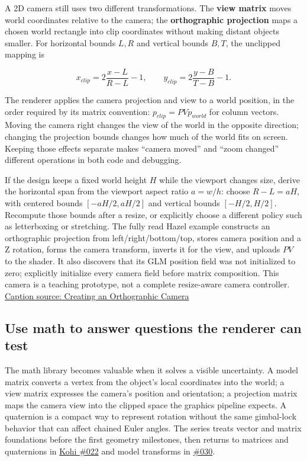 \hypertarget{06-engine-ii-ch026-keep-an-orthographic-cameras-view-and-projection-jobs-separate}{}

A 2D camera still uses two different transformations. The \textbf{view matrix} moves world coordinates relative to the camera; the \textbf{orthographic projection} maps a chosen world rectangle into clip coordinates without making distant objects smaller. For horizontal bounds \(L,R\) and vertical bounds \(B,T\), the unclipped mapping is

\[
x_{clip}=2\frac{x-L}{R-L}-1,\qquad y_{clip}=2\frac{y-B}{T-B}-1.
\]

The renderer applies the camera projection and view to a world position, in the order required by its matrix convention: \(p_{clip}=P V p_{world}\) for column vectors. Moving the camera right changes the view of the world in the opposite direction; changing the projection bounds changes how much of the world fits on screen. Keeping those effects separate makes ``camera moved'' and ``zoom changed'' different operations in both code and debugging.

If the design keeps a fixed world height \(H\) while the viewport changes size, derive the horizontal span from the viewport aspect ratio \(a=w/h\): choose \(R-L=aH\), with centered bounds \([-aH/2,aH/2]\) and vertical bounds \([-H/2,H/2]\). Recompute those bounds after a resize, or explicitly choose a different policy such as letterboxing or stretching. The fully read Hazel example constructs an orthographic projection from left/right/bottom/top, stores camera position and a Z rotation, forms the camera transform, inverts it for the view, and uploads \(PV\) to the shader. It also discovers that its GLM position field was not initialized to zero; explicitly initialize every camera field before matrix composition. This camera is a teaching prototype, not a complete resize-aware camera controller. \href{https://www.youtube.com/watch?v=NjKv-HWstxA}{Caption source: Creating an Orthographic Camera}

\subsection{Use math to answer questions the renderer can test}\label{06-engine-ii-ch026-use-math-to-answer-questions-the-renderer-can-test}

\hypertarget{06-engine-ii-ch026-use-math-to-answer-questions-the-renderer-can-test}{}

The math library becomes valuable when it solves a visible uncertainty. A model matrix converts a vertex from the object's local coordinates into the world; a view matrix expresses the camera's position and orientation; a projection matrix maps the camera view into the clipped space the graphics pipeline expects. A quaternion is a compact way to represent rotation without the same gimbal-lock behavior that can affect chained Euler angles. The series treats vector and matrix foundations before the first geometry milestones, then returns to matrices and quaternions in \href{https://www.youtube.com/watch?v=nk3KNPrSRqc}{Kohi \#022} and model transforms in \href{https://www.youtube.com/watch?v=xGonaV-OB7E}{\#030}.

